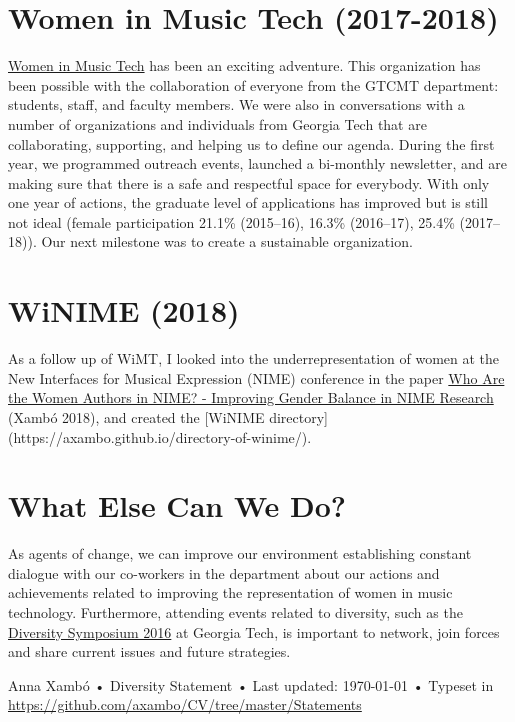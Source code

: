 \documentclass[10pt, a4paper]{article}
\begin{document}
\section*{Women in Music Tech (2017-2018)}

\href{http://www.gtcmt.gatech.edu/womeninmusictech}{Women in Music Tech} has been an exciting adventure. This organization has been possible with the collaboration of everyone from the GTCMT department: students, staff, and faculty members. We were also in conversations with a number of organizations and individuals from Georgia Tech that are collaborating, supporting, and helping us to define our agenda. During the first year, we programmed outreach events, launched a bi-monthly newsletter, and are making sure that there is a safe and respectful space for everybody. With only one year of actions, the graduate level of applications has improved but is still not ideal (female participation 21.1\% (2015--16), 16.3\% (2016--17), 25.4\% (2017--18)). Our next milestone was to create a sustainable organization. 

\section*{WiNIME (2018)}

As a follow up of WiMT, I looked into the underrepresentation of women at the New Interfaces for Musical Expression (NIME) conference in the paper  \href{http://annaxambo.me/pub/Xambo_2018_WiNIME.pdf}{Who Are the Women Authors in NIME? - Improving Gender Balance in NIME Research} (Xambó 2018), and created the [WiNIME directory](https://axambo.github.io/directory-of-winime/).

\section*{What Else Can We Do?}

As agents of change, we can improve our environment establishing constant dialogue with our co-workers in the department about our actions and achievements related to improving the representation of women in music technology. Furthermore, attending events related to diversity, such as the \href{http://www.diversity.gatech.edu/diversitysymposium}{Diversity Symposium 2016} at Georgia Tech, is important to network, join forces and share current issues and future strategies. 

\vfill{}

\begin{center}
{\scriptsize  Anna Xambó •\- Diversity Statement •\- Last updated: \today\- •\- %
Typeset in \href{http://nitens.org/taraborelli/cvtex}{
\XeTeX }\\
\href{https://github.com/axambo/CV/tree/master/Statements}{https://github.com/axambo/CV/tree/master/Statements}}
\end{center}
\end{document}
